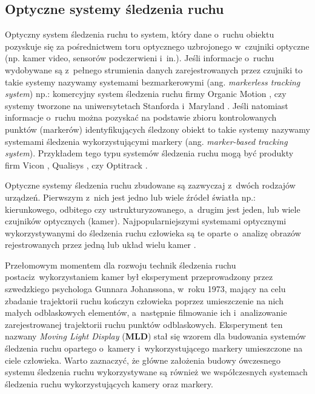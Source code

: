 \subsection{Optyczne systemy śledzenia ruchu}
Optyczny system śledzenia ruchu to system, który dane o~ruchu obiektu pozyskuje się za pośrednictwem toru optycznego uzbrojonego w~czujniki optyczne (np. kamer video, sensorów podczerwieni i~in.). Jeśli informacje o~ruchu wydobywane są z~pełnego strumienia danych zarejestrowanych przez czujniki to takie systemy nazywamy systemami bezmarkerowymi (ang. \textsl{markerless tracking system}) np.: komercyjny system śledzenia ruchu firmy Organic Motion \cite{OrganicmoitonWebsite}, czy systemy tworzone na uniwersytetach Stanforda \cite{StanfordBiomotion} i~Maryland \cite{Sundaresan2005,Sundaresan2007}. Jeśli natomiast informacje o~ruchu można pozyskać na podstawie zbioru kontrolowanych punktów (markerów) identyfikujących śledzony obiekt to takie systemy nazywamy systemami śledzenia wykorzystującymi markery (ang. \textsl{marker-based tracking system}). Przykładem tego typu systemów śledzenia ruchu mogą być produkty firm Vicon \cite{ViconWebsite}, Qualisys \cite{QulisysWebsite}, czy Optitrack \cite{OptitrackWebsite}.

Optyczne systemy śledzenia ruchu zbudowane są zazwyczaj z~dwóch rodzajów urządzeń. Pierwszym z~nich jest jedno lub wiele źródeł światła np.: kierunkowego, odbitego czy ustrukturyzowanego, a~drugim jest jeden, lub wiele czujników optycznych (kamer). Najpopularniejszymi systemami optycznymi wykorzystywanymi do śledzenia ruchu człowieka są te oparte o~analizę obrazów rejestrowanych przez jedną \cite{schmidt2006kernel,RuiLi2006} lub układ wielu kamer \cite{Sundaresan2005,ViconWebsite,QulisysWebsite}. 

Przełomowym momentem dla rozwoju technik śledzenia ruchu postaciz~wykorzystaniem kamer był eksperyment przeprowadzony przez szwedzkiego psychologa Gunnara Johanssona, w~roku 1973, mający na celu zbadanie trajektorii ruchu kończyn człowieka poprzez umieszczenie na nich małych odblaskowych elementów, a~następnie filmowanie ich i~analizowanie zarejestrowanej trajektorii ruchu punktów odblaskowych. Eksperyment ten nazwany \emph{Moving Light Display} (\textbf{MLD}) \cite{Johansson1973} stał się wzorem dla budowania systemów śledzenia ruchu opartego o~kamery i~wykorzystującego markery umieszczone na ciele człowieka. Warto zaznaczyć, że główne założenia budowy ówczesnego systemu śledzenia ruchu wykorzystywane są również we współczesnych systemach śledzenia ruchu wykorzystujących kamery oraz markery.

